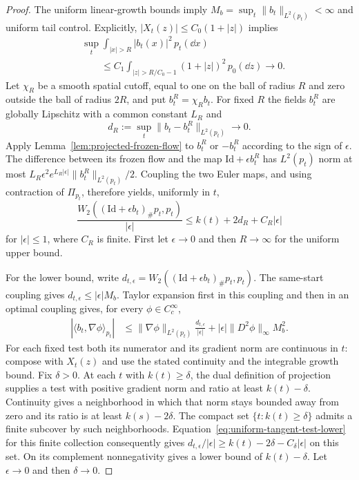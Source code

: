 \begin{proof}
The uniform linear-growth bounds imply
$M_b=\sup_t\|b_t\|_{L^2(p_t)}<\infty$ and uniform tail control.
Explicitly, $|X_t(z)|\le C_0(1+|z|)$ implies
\begin{align*}
 &\sup_t\int_{|x|>R}|b_t(x)|^2\,p_t(\dd x)\\
 &\qquad\le C_1\int_{|z|>R/C_0-1}(1+|z|)^2\,p_0(\dd z)
 \longrightarrow0.
\end{align*}
Let $\chi_R$ be a smooth spatial cutoff, equal to one on the ball of
radius $R$ and zero outside the ball of radius $2R$, and put
$b_t^R=\chi_Rb_t$.  For fixed $R$ the fields $b_t^R$ are globally
Lipschitz with a common constant $L_R$ and
\[
 d_R:=\sup_t\|b_t-b_t^R\|_{L^2(p_t)}\longrightarrow0.
\]
Apply Lemma~\ref{lem:projected-frozen-flow} to $b_t^R$ or $-b_t^R$
according to the sign of $\epsilon$.  The difference between its frozen
flow and the map $\mathrm{Id}+\epsilon b_t^R$ has $L^2(p_t)$ norm
at most
$L_R\epsilon^2e^{L_R|\epsilon|}\|b_t^R\|_{L^2(p_t)}/2$.
Coupling the two Euler maps, and using contraction of $\Pi_{p_t}$,
therefore yields, uniformly in $t$,
\begin{equation}
 \frac{W_2((\mathrm{Id}+\epsilon b_t)_\#p_t,p_t)}{|\epsilon|}
 \le k(t)+2d_R+C_R|\epsilon|
 \label{eq:uniform-tangent-upper}
\end{equation}
for $|\epsilon|\le1$, where $C_R$ is finite.  First let
$\epsilon\to0$ and then $R\to\infty$ for the uniform upper bound.

For the lower bound, write
$d_{t,\epsilon}=W_2((\mathrm{Id}+\epsilon b_t)_\#p_t,p_t)$.
The same-start coupling gives $d_{t,\epsilon}\le|\epsilon|M_b$.
Taylor expansion first in this coupling and then in an optimal
coupling gives, for every $\phi\in C_c^\infty$,
\begin{align}
 |\langle b_t,\nabla\phi\rangle_{p_t}|
 &\le \|\nabla\phi\|_{L^2(p_t)}
              \frac{d_{t,\epsilon}}{|\epsilon|}
       +|\epsilon|\|D^2\phi\|_\infty M_b^2.
 \label{eq:uniform-tangent-test-lower}
\end{align}
For each fixed test both its numerator and its gradient norm are
continuous in $t$: compose with $X_t(z)$ and use the stated continuity
and the integrable growth bound.  Fix $\delta>0$.  At each $t$ with
$k(t)\ge\delta$, the dual definition of projection supplies a test
with positive gradient norm and ratio at least $k(t)-\delta$.
Continuity gives a neighborhood in which that norm stays bounded
away from zero and its ratio is at least $k(s)-2\delta$.
The compact set $\{t:k(t)\ge\delta\}$ admits a finite subcover by
such neighborhoods.  Equation~\eqref{eq:uniform-tangent-test-lower}
for this finite collection consequently gives
$d_{t,\epsilon}/|\epsilon|\ge k(t)-2\delta-C_\delta|\epsilon|$
on this set.  On its complement nonnegativity gives a lower bound of
$k(t)-\delta$.  Let $\epsilon\to0$ and then $\delta\to0$.
\end{proof}

